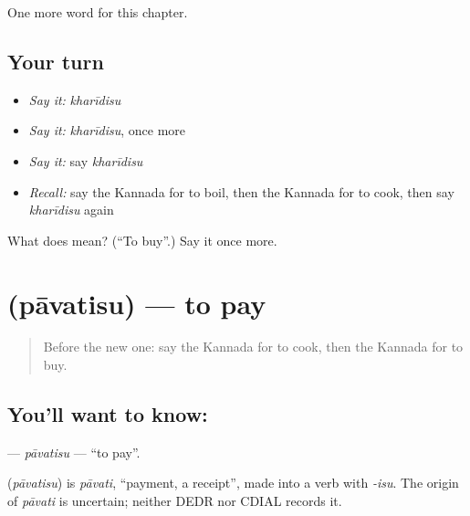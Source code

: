 \begin{grammarlens}[title={What you've built}]
One more word for this chapter.
\end{grammarlens}

\subsection*{Your turn}
\begin{itemize}
\raggedright
  \item \emph{Say it:} \emph{kharīdisu}
  \item \emph{Say it:} \emph{kharīdisu}, once more
  \item \emph{Say it:} say \emph{kharīdisu}
  \item \emph{Recall:} say the Kannada for to boil, then the Kannada for to cook, then say \emph{kharīdisu} again
\end{itemize}

\begin{tcolorbox}[breakable,colback=teal!4,colframe=teal!35!black,title={Before you move on}]
What does  mean? (\textquotedblleft{}To buy\textquotedblright{}.) Say it once more.
\end{tcolorbox}
\section[\texorpdfstring{\kn{ಪಾವತಿಸು} (pāvatisu)}{ಪಾವತಿಸು (pāvatisu)}]{ (pāvatisu) — to pay}

\label{lesson:KA-C158-pavatisu}



\begin{quote}
Before the new one: say the Kannada for to cook, then the Kannada for to buy.
\end{quote}

\subsection*{You'll want to know: }
\textbf{} — \emph{pāvatisu} — \textquotedblleft{}to pay\textquotedblright{}.

\begin{cousinweb}
\textbf{} (\emph{pāvatisu}) is \emph{pāvati}, \textquotedblleft{}payment, a receipt\textquotedblright{}, made into a verb with \emph{-isu}. The origin of \emph{pāvati} is uncertain; neither DEDR nor CDIAL records it.
\end{cousinweb}

